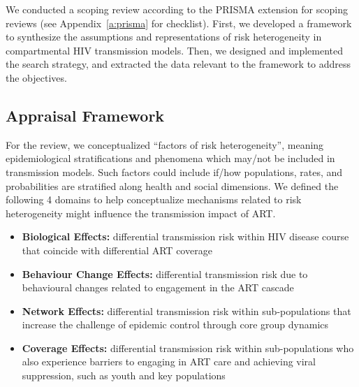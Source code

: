 We conducted a scoping review according to the PRISMA extension for scoping reviews
(see Appendix~\ref{a:prisma} for checklist).
First, we developed a framework to synthesize  %
the assumptions and representations of risk heterogeneity
in compartmental HIV transmission models.
Then, we designed and implemented the search strategy,
and extracted the data relevant to the framework
to address the objectives.
\subsection{Appraisal Framework}  %
\label{ss:meth:framework}
For the review, we conceptualized ``factors of risk heterogeneity'', meaning
epidemiological stratifications and phenomena which may/not be included in transmission models.
Such factors could include if/how populations, rates, and probabilities
are stratified along health and social dimensions.   %
We defined the following 4 domains to help conceptualize
mechanisms related to risk heterogeneity might influence the transmission impact of ART.
\begin{itemize}
  \item \textbf{Biological Effects:}
  differential transmission risk within HIV disease course
  that coincide with differential ART coverage
  \cite{Pilcher2004}
  \item \textbf{Behaviour Change Effects:}
  differential transmission risk due to
  behavioural changes related to engagement in the ART cascade
  \cite{Ramachandran2016,Tiwari2020} %
  \item \textbf{Network Effects:}
  differential transmission risk within sub-populations
  that increase the challenge of epidemic control through core group dynamics
  \cite{Anderson1986,Boily1997,Watts2010,Dodd2010}
  \item \textbf{Coverage Effects:}
  differential transmission risk within sub-populations
  who also experience barriers to engaging in ART care and achieving viral suppression,
  such as youth and key populations
  \cite{Mountain2014,Lancaster2016,Hakim2018,Green2020}
\end{itemize}
